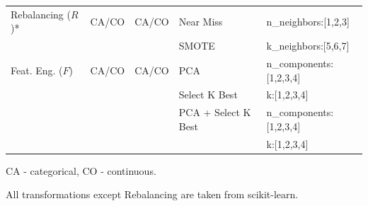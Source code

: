 \begin{example}
\begin{table}[!t]
\begin{threeparttable}
\begin{tabular}{@{}p{30mm}lll>{\ttfamily}l@{}}
Rebalancing ($R$)* &CA/CO  & CA/CO & Near Miss & n\_neighbors:[1,2,3]\\ \cmidrule[.05em]{4-5}
&  &  & SMOTE & k\_neighbors:[5,6,7]\\	\cmidrule[.1em]{1-5}

Feat. Eng. ($F$) & CA/CO & CA/CO & PCA & n\_components:[1,2,3,4]\\ \cmidrule[.05em]{4-5}
&  &  & Select K Best & k:[1,2,3,4]\\ \cmidrule[.05em]{4-5}
&  &  & PCA + Select K Best  & n\_components:[1,2,3,4]
\\ \cmidrule[.05em]{4-5} & & & & k:[1,2,3,4]\\	\bottomrule%
\end{tabular}
\begin{tablenotes}
\footnotesize
\item CA - categorical, CO - continuous.
\item *All transformations except Rebalancing are taken from scikit-learn.
\end{tablenotes}
\end{threeparttable}
\label{tbl:transformations}
\end{table}
\end{example}

